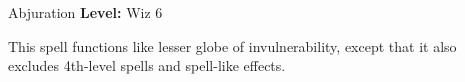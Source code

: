 {Abjuration}
{
	\textbf{Level:}
	Wiz 6\\
}
{
	This spell functions like lesser globe of invulnerability, except that it also excludes 4th-level spells and spell-like effects.

}
